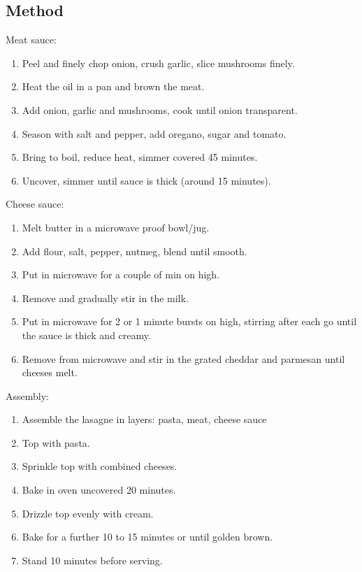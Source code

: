 \subsection{Method}

Meat sauce:

\begin{enumerate}
    \item Peel and finely chop onion, crush garlic, slice mushrooms finely.
    \item Heat the oil in a pan and brown the meat.
    \item Add onion, garlic and mushrooms, cook until onion transparent.
    \item Season with salt and pepper, add oregano, sugar and tomato.
    \item Bring to boil, reduce heat, simmer covered 45 minutes.
    \item Uncover, simmer until sauce is thick (around 15 minutes).
\end{enumerate}

Cheese sauce:

\begin{enumerate}
    \item Melt butter in a microwave proof bowl/jug.
    \item Add flour, salt, pepper, nutmeg, blend until smooth.
    \item Put in microwave for a couple of min on high.
    \item Remove and gradually stir in the milk.
    \item Put in microwave for 2 or 1 minute bursts on high, stirring after each go until the sauce is thick and creamy.
    \item Remove from microwave and stir in the grated cheddar and parmesan until cheeses melt.
\end{enumerate}

Assembly:

\begin{enumerate}
    \item Assemble the lasagne in layers: pasta, meat, cheese sauce
    \item Top with pasta.
    \item Sprinkle top with combined cheeses.
    \item Bake in  oven uncovered 20 minutes.
    \item Drizzle top evenly with cream.
    \item Bake for a further 10 to 15 minutes or until golden brown.
    \item Stand 10 minutes before serving.
\end{enumerate}